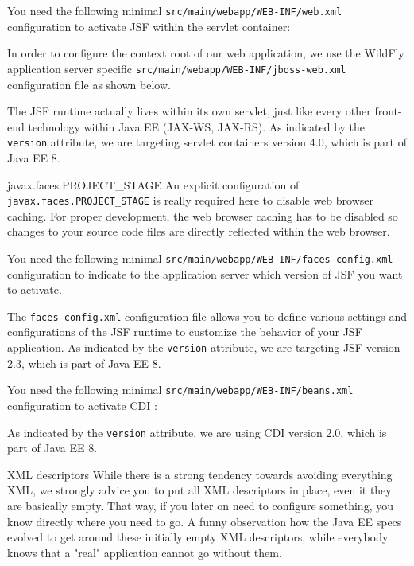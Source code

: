 You need the following minimal \texttt{src/main/webapp/WEB-INF/web.xml} configuration to activate JSF within the servlet container:

In order to configure the context root of our web application, we use the WildFly application server specific 
\texttt{src/main/webapp/WEB-INF/jboss-web.xml} configuration file as shown below.

The JSF runtime actually lives within its own servlet, just like every other front-end technology within Java EE (JAX-WS, JAX-RS).
As indicated by the \texttt{version} attribute, we are targeting servlet containers version 4.0, which is part of Java EE 8.
\begin{TIP}{javax.faces.PROJECT\_STAGE}
An explicit configuration of \texttt{javax.faces.PROJECT\_STAGE} is really required here to disable web browser caching.
For proper development, the web browser caching has to be disabled so changes to your source code files are directly reflected within the web browser.
\end{TIP}

You need the following minimal \texttt{src/main/webapp/WEB-INF/faces-config.xml} configuration to indicate to the application server which version of JSF you want to activate.

The \texttt{faces-config.xml} configuration file allows you to define various settings and configurations of the JSF runtime to customize the behavior of your JSF application.
As indicated by the \texttt{version} attribute, we are targeting JSF version 2.3, which is part of Java EE 8.

You need the following minimal \texttt{src/main/webapp/WEB-INF/beans.xml} configuration to activate CDI \cite{CDI2}:

As indicated by the \texttt{version} attribute, we are using CDI version 2.0, which is part of Java EE 8.
\begin{TIP}{XML descriptors}
While there is a strong tendency towards avoiding everything XML,
we strongly advice you to put all XML descriptors in place,
even it they are basically empty.
That way, if you later on need to configure something,
you know directly where you need  to go.
A  funny observation how  the Java EE specs evolved to get around these initially empty XML descriptors,
while everybody knows that a  "real" application cannot go without them.
\end{TIP}

